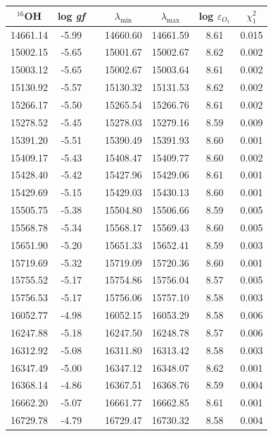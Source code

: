   \begin{table}[h!]
    
    \begin{center}
      \vfill
        \begin{tabular}{ccccccc}
        \hline
        \hline
        $^{16}$OH &log \textit{gf}&& $\lambda_{\mathrm{min}}$ & $\lambda_{\mathrm{max}}$ & log $\varepsilon_{O_1}$& $\chi^2_1$\\
        \hline
        14661.14 & -5.99& & 14660.60&14661.59& 8.61&0.015\\
15002.15 & -5.65& & 15001.67&15002.67& 8.62&0.002\\
15003.12 & -5.65& & 15002.67&15003.64& 8.61&0.002\\
15130.92 & -5.57& & 15130.32&15131.53& 8.62&0.002\\
15266.17 & -5.50& & 15265.54&15266.76& 8.61&0.002\\
15278.52 & -5.45& & 15278.03&15279.16& 8.59&0.009\\
15391.20 & -5.51& & 15390.49&15391.93& 8.60&0.001\\
15409.17 & -5.43& & 15408.47&15409.77& 8.60&0.002\\
15428.40 & -5.42& & 15427.96&15429.06& 8.61&0.001\\
15429.69 & -5.15& & 15429.03&15430.13& 8.60&0.001\\
15505.75 & -5.38& & 15504.80&15506.66& 8.59&0.005\\
15568.78 & -5.34& & 15568.17&15569.43& 8.60&0.005\\
15651.90 & -5.20& & 15651.33&15652.41& 8.59&0.003\\
15719.69 & -5.32& & 15719.09&15720.36& 8.60&0.001\\
15755.52 & -5.17& & 15754.86&15756.04& 8.57&0.005\\
15756.53 & -5.17& & 15756.06&15757.10& 8.58&0.003\\
16052.77 & -4.98& & 16052.15&16053.29& 8.58&0.006\\
16247.88 & -5.18& & 16247.50&16248.78& 8.57&0.006\\
16312.92 & -5.08& & 16311.80&16313.42& 8.58&0.003\\
16347.49 & -5.00& & 16347.12&16348.07& 8.62&0.001\\
16368.14 & -4.86& & 16367.51&16368.76& 8.59&0.004\\
16662.20 & -5.07& & 16661.77&16662.85& 8.61&0.001\\
16729.78 & -4.79& & 16729.47&16730.32& 8.58&0.004\\

\end{tabular}
\end{center}
\end{table}
